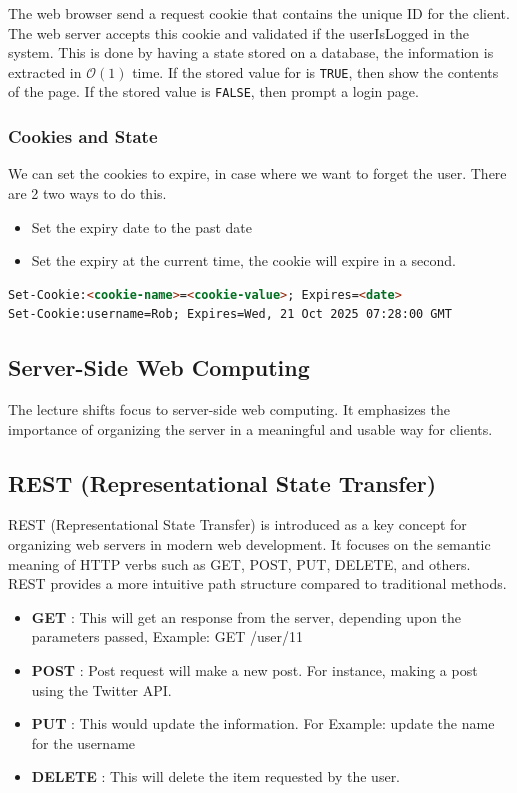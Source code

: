 The web browser send a request cookie that contains the unique ID for the client. The web server accepts this cookie and validated if the userIsLogged in the system. This is done by having a state stored on a database, the information is extracted in $\mathcal{O}(1)$ time. If the stored value for is \texttt{TRUE}, then show the contents of the page. If the stored value is \texttt{FALSE}, then prompt a login page. 

\subsubsection{Cookies and State}
We can set the cookies to expire, in case where we want to forget the user. There are 2 two ways to do this. 

\begin{itemize}[noitemsep, topsep=4pt]
	\item Set the expiry date to the past date 
        \item Set the expiry at the current time, the cookie will expire in a second. 
\end{itemize}

\begin{lstlisting}[language=html,caption=Set cookie to expire]
Set-Cookie:<cookie-name>=<cookie-value>; Expires=<date> 
Set-Cookie:username=Rob; Expires=Wed, 21 Oct 2025 07:28:00 GMT 
\end{lstlisting}

\subsection{Server-Side Web Computing}

The lecture shifts focus to server-side web computing. It emphasizes the importance of organizing the server in a meaningful and usable way for clients.

\subsection{REST (Representational State Transfer)}

REST (Representational State Transfer) is introduced as a key concept for organizing web servers in modern web development. It focuses on the semantic meaning of HTTP verbs such as GET, POST, PUT, DELETE, and others. REST provides a more intuitive path structure compared to traditional methods.

\begin{itemize}[noitemsep, topsep=4pt]
	\item \textbf{GET} : This will get an response from the server, depending upon the parameters passed, Example: GET /user/11
	\item \textbf{POST} : Post request will make a new post. For instance, making a post using the Twitter API.
	\item \textbf{PUT} : This would update the information. For Example: update the name for the username
	\item \textbf{DELETE} : This will delete the item requested by the user.
\end{itemize}

